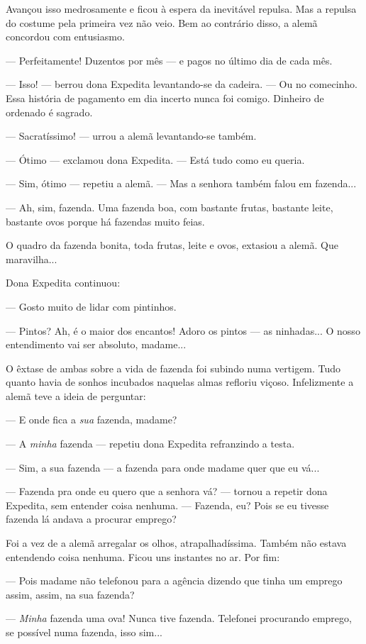 Avançou isso medrosamente e ficou à espera da inevitável repulsa. Mas a
repulsa do costume pela primeira vez não veio. Bem ao contrário disso, a
alemã concordou com entusiasmo.

--- Perfeitamente! Duzentos por mês --- e pagos no último dia de cada
mês.

--- Isso! --- berrou dona Expedita levantando-se da cadeira. --- Ou no
comecinho. Essa história de pagamento em dia incerto nunca foi comigo.
Dinheiro de ordenado é sagrado.

--- Sacratíssimo! --- urrou a alemã levantando-se também.

--- Ótimo --- exclamou dona Expedita. --- Está tudo como eu queria.

--- Sim, ótimo --- repetiu a alemã. --- Mas a senhora também falou em
fazenda...

--- Ah, sim, fazenda. Uma fazenda boa, com bastante frutas, bastante
leite, bastante ovos porque há fazendas muito feias.

O quadro da fazenda bonita, toda frutas, leite e ovos, extasiou a alemã.
Que maravilha...

Dona Expedita continuou:

--- Gosto muito de lidar com pintinhos.

--- Pintos? Ah, é o maior dos encantos! Adoro os pintos --- as
ninhadas... O nosso entendimento vai ser absoluto, madame...

O êxtase de ambas sobre a vida de fazenda foi subindo numa vertigem.
Tudo quanto havia de sonhos incubados naquelas almas refloriu viçoso.
Infelizmente a alemã teve a ideia de perguntar:

--- E onde fica a \emph{sua} fazenda, madame?

--- A \emph{minha} fazenda --- repetiu dona Expedita refranzindo a
testa.

--- Sim, a sua fazenda --- a fazenda para onde madame quer que eu vá...

--- Fazenda pra onde eu quero que a senhora vá? --- tornou a repetir
dona Expedita, sem entender coisa nenhuma. --- Fazenda, eu? Pois se eu
tivesse fazenda lá andava a procurar emprego?

Foi a vez de a alemã arregalar os olhos, atrapalhadíssima. Também não
estava entendendo coisa nenhuma. Ficou uns instantes no ar. Por fim:

--- Pois madame não telefonou para a agência dizendo que tinha um
emprego assim, assim, na sua fazenda?

--- \emph{Minha} fazenda uma ova! Nunca tive fazenda. Telefonei
procurando emprego, se possível numa fazenda, isso sim...


